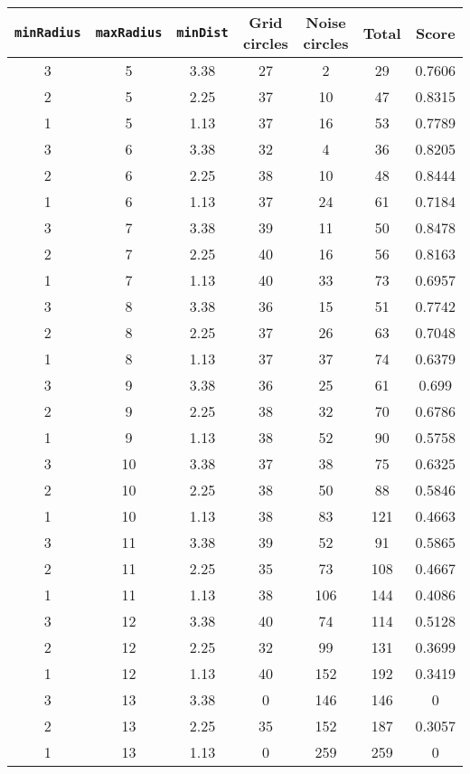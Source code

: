 \documentclass[letterpaper, 12pt]{article}
\begin{document}
\begin{longtable}{|c|c|c|c|c|c|c|}
\hline
\textbf{\texttt{minRadius}} & \textbf{\texttt{maxRadius}} & \textbf{\texttt{minDist}} & \textbf{Grid circles} & \textbf{Noise circles} & \textbf{Total} & \textbf{Score} \\
\hline
3 & 5 & 3.38 & 27 & 2 & 29 & 0.7606 \\
\hline
2 & 5 & 2.25 & 37 & 10 & 47 & 0.8315 \\
\hline
1 & 5 & 1.13 & 37 & 16 & 53 & 0.7789 \\
\hline
3 & 6 & 3.38 & 32 & 4 & 36 & 0.8205 \\
\hline
2 & 6 & 2.25 & 38 & 10 & 48 & 0.8444 \\
\hline
1 & 6 & 1.13 & 37 & 24 & 61 & 0.7184 \\
\hline
3 & 7 & 3.38 & 39 & 11 & 50 & 0.8478 \\
\hline
2 & 7 & 2.25 & 40 & 16 & 56 & 0.8163 \\
\hline
1 & 7 & 1.13 & 40 & 33 & 73 & 0.6957 \\
\hline
3 & 8 & 3.38 & 36 & 15 & 51 & 0.7742 \\
\hline
2 & 8 & 2.25 & 37 & 26 & 63 & 0.7048 \\
\hline
1 & 8 & 1.13 & 37 & 37 & 74 & 0.6379 \\
\hline
3 & 9 & 3.38 & 36 & 25 & 61 & 0.699 \\
\hline
2 & 9 & 2.25 & 38 & 32 & 70 & 0.6786 \\
\hline
1 & 9 & 1.13 & 38 & 52 & 90 & 0.5758 \\
\hline
3 & 10 & 3.38 & 37 & 38 & 75 & 0.6325 \\
\hline
2 & 10 & 2.25 & 38 & 50 & 88 & 0.5846 \\
\hline
1 & 10 & 1.13 & 38 & 83 & 121 & 0.4663 \\
\hline
3 & 11 & 3.38 & 39 & 52 & 91 & 0.5865 \\
\hline
2 & 11 & 2.25 & 35 & 73 & 108 & 0.4667 \\
\hline
1 & 11 & 1.13 & 38 & 106 & 144 & 0.4086 \\
\hline
3 & 12 & 3.38 & 40 & 74 & 114 & 0.5128 \\
\hline
2 & 12 & 2.25 & 32 & 99 & 131 & 0.3699 \\
\hline
1 & 12 & 1.13 & 40 & 152 & 192 & 0.3419 \\
\hline
3 & 13 & 3.38 & 0 & 146 & 146 & 0 \\
\hline
2 & 13 & 2.25 & 35 & 152 & 187 & 0.3057 \\
\hline
1 & 13 & 1.13 & 0 & 259 & 259 & 0 \\

\end{longtable}
\end{document}
